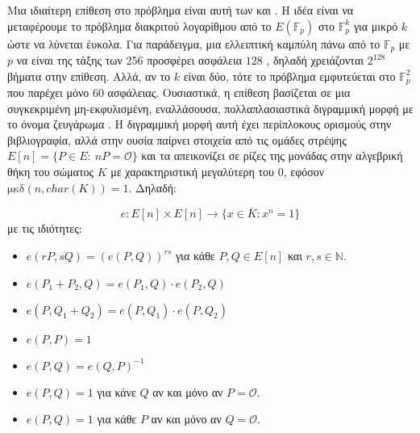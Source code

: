 \documentclass[oneside,a4paper]{article}
\begin{document}
\vspace*{0.3cm}
\noindent Μια ιδιαίτερη επίθεση στο πρόβλημα  είναι αυτή των  και  \cite{mov}. Η ιδέα είναι να μεταφέρουμε το πρόβλημα διακριτού λογαρίθμου από το $E(\mathbb{F}_p)$ στο $\mathbb{F}_p^k$ για μικρό $k$ ώστε να λύνεται έυκολα. Για παράδειγμα, μια ελλειπτική καμπύλη πάνω από το $\mathbb{F}_p$ με $p$ να είναι της τάξης των 256  προσφέρει ασφάλεια $128$ , δηλαδή χρειάζονται $2^{128}$ βήματα στην επίθεση. Αλλά, αν το $k$ είναι δύο, τότε το πρόβλημα εμφυτεύεται στο $\mathbb{F}_p^2$ που παρέχει μόνο $60$  ασφάλειας. Ουσιαστικά, η επίθεση βασίζεται σε μια συγκεκριμένη μη-εκφυλισμένη, εναλλάσουσα, πολλαπλασιαστικά διγραμμική μορφή με το όνομα ζευγάρωμα . Η διγραμμική μορφή αυτή έχει περίπλοκους ορισμούς στην βιβλιογραφία, αλλά στην ουσία παίρνει στοιχεία από τις ομάδες στρέψης $E[n]= \{P \in E: \ nP = \mathcal{O}\}$ και τα απεικονίζει σε ρίζες της μονάδας στην αλγεβρική θήκη του σώματος $K$ με χαρακτηριστική μεγαλύτερη του $0$, εφόσον $\text{μκδ}(n,char(K)) = 1$. Δηλαδή:

$$e: E[n]\times E[n] \longrightarrow \{x\in \overline{K}: x^n = 1\}$$ με τις ιδιότητες:

\begin{itemize}
	\item $e(rP,sQ) = \left(e(P,Q)\right)^{rs}$ για κάθε $P,Q \in E[n]$ και $r,s\in \mathbb{N}$.
	\item $e(P_1 + P_2, Q) = e(P_1,Q)\cdot e(P_2,Q)$
	\item $e(P, Q_1 + Q_2) = e(P,Q_1)\cdot e(P,Q_2)$
	\item $e(P,P) = 1$
	\item $e(P,Q) = e(Q,P)^{-1}$
	\item $e(P,Q) = 1$ για κάνε $Q$ αν και μόνο αν $P=\mathcal{O}$.
	\item $e(P,Q) = 1$ για κάθε $P$ αν και μόνο αν $Q = \mathcal{O}$.
\end{itemize}
\end{document}
